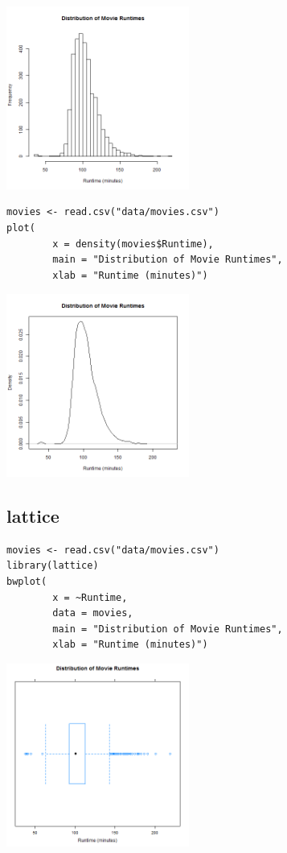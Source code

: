 \documentclass[a4paper, captions=tableheading]{tufte-book}
\begin{document}
\includegraphics[height=6cm]{img/1-num-base-03.png}

\begin{verbatim}
movies <- read.csv("data/movies.csv")
plot(
		x = density(movies$Runtime),
		main = "Distribution of Movie Runtimes",
		xlab = "Runtime (minutes)")
\end{verbatim}

\includegraphics[height=6cm]{img/1-num-base-04.png}

\subsection{lattice}
\label{sec:orgheadline8}

\begin{verbatim}
movies <- read.csv("data/movies.csv")
library(lattice)
bwplot(
		x = ~Runtime,
		data = movies,
		main = "Distribution of Movie Runtimes",
		xlab = "Runtime (minutes)")
\end{verbatim}

\includegraphics[height=6cm]{img/1-num-lattice-02.png}
\end{document}
